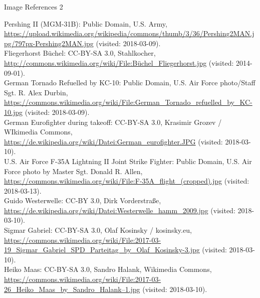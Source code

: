 \documentclass[presentation]{beamer}
\begin{document}
\begin{frame}[label={sec:org484ac85}]{Image References 2}
\tiny

Pershing II (MGM-31B): Public Domain, U.S. Army, \url{https://upload.wikimedia.org/wikipedia/commons/thumb/3/36/Pershing2MAN.jpg/797px-Pershing2MAN.jpg} (visited: 2018-03-09).\\[0.3em]

Fliegerhorst Büchel: CC-BY-SA 3.0, Stahlkocher, \url{http://commons.wikimedia.org/wiki/File:Büchel_Fliegerhorst.jpg} (visited: 2014-09-01).\\[0.3em]

German Tornado Refuelled by KC-10: Public Domain, U.S. Air Force photo/Staff Sgt. R. Alex Durbin, \url{https://commons.wikimedia.org/wiki/File:German_Tornado_refuelled_by_KC-10.jpg} (visited: 2018-03-09).\\[0.3em]

German Eurofighter during takeoff: CC-BY-SA 3.0, Krasimir Grozev / WIkimedia Commons, \url{https://de.wikipedia.org/wiki/Datei:German_eurofighter.JPG} (visited: 2018-03-10).\\[0.3em]

U.S. Air Force F-35A Lightning II Joint Strike Fighter: Public Domain, U.S. Air Force photo by Master Sgt. Donald R. Allen, \url{https://commons.wikimedia.org/wiki/File:F-35A_flight_(cropped).jpg} (visited: 2018-03-13).\\[0.3em]

Guido Westerwelle: CC-BY 3.0, Dirk Vorderstraße, \url{https://de.wikipedia.org/wiki/Datei:Westerwelle_hamm_2009.jpg} (visited: 2018-03-10).\\[0.3em]

Sigmar Gabriel: CC-BY-SA 3.0, Olaf Kosinsky / kosinsky.eu, \url{https://commons.wikimedia.org/wiki/File:2017-03-19_Sigmar_Gabriel_SPD_Parteitag_by_Olaf_Kosinsky-3.jpg} (visited: 2018-03-10).\\[0.3em]

Heiko Maas: CC-BY-SA 3.0, Sandro Halank, Wikimedia Commons, \url{https://commons.wikimedia.org/wiki/File:2017-03-26_Heiko_Maas_by_Sandro_Halank–1.jpg} (visited: 2018-03-10).\\[0.3em]
\end{frame}
\end{document}
